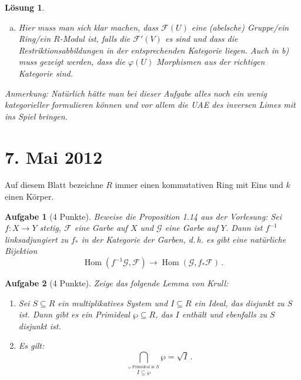 \documentclass[a4paper, 12pt, numbers=noendperiod, chapterprefix=true]{scrbook}
\theoremstyle{break}
\newtheorem{Aufg}{Aufgabe}
\newtheorem{Loes}{L\"osung}
\theoremstyle{nonumberbreak}
\theoremstyle{nonumberplain}
\DeclareMathOperator{\Hom}{Hom}
\newcommand{\F}{\mathcal{F}} %
\newcommand{\G}{\mathcal{G}} %
\begin{document}
\begin{Loes}
\begin{enumerate}[a)]
Sei $f \in \F(U)$. F\"ur alle $V \subseteq U, V \in \mathcal{B}$ sind die Schnitte $\rho^U_V(\varphi(U)(f)) = \varphi(V)(\rho^U_V(f)) \in \G(V)$ festgelegt und bilden eine konsistente Familie in $\G$. Da $\G$ eine Garbe ist, ist $\varphi(U)(f) \in \G(U)$ damit eindeutig bestimmt.

Ist $U' \subseteq U \subseteq X$ offen, dann ist jedes $V \subseteq U', V \in \mathcal{B}$ auch in $U$ enthalten. Es gilt $\rho^{U'}_V(\rho^U_{U'}(\varphi(U)(f))) = \rho^U_V(\varphi(U)(f)) = \varphi(V)(\rho^U_V(f))$, also ist $\rho^U_{U'}(\varphi(U)(f))$ ein Amalgam f\"ur die $\varphi(V)(\rho^U_V(f))$ und es gilt $\rho^U_{U'}(\varphi(U)(f)) = \varphi(U')(\rho^U_ {U'}(f))$. 

\item Hier muss man sich klar machen, dass $\F(U)$ eine (abelsche) Gruppe/ein Ring/ein $R$-Modul ist, falls die $\F'(V)$ es sind und dass die Restriktionsabbildungen in der entsprechenden Kategorie liegen. Auch in b) muss gezeigt werden, dass die $\varphi(U)$ Morphismen aus der richtigen Kategorie sind.
\end{enumerate}

\textit{Anmerkung:} Nat\"urlich h\"atte man bei dieser Aufgabe alles noch ein wenig kategorieller formulieren k\"onnen und vor allem die UAE des inversen Limes mit ins Spiel bringen.
\end{Loes}

\newpage
\section{7. Mai 2012}
\setcounter{Aufg}{0}
\setcounter{Loes}{0}

Auf diesem Blatt bezeichne $R$ immer einen kommutativen Ring mit Eins und $k$ einen %
K\"orper.

\begin{Aufg}[4 Punkte]
 Beweise die Proposition 1.14 aus der Vorlesung:
Sei $f\colon X\to Y$ stetig, $\mathcal{F}$ eine Garbe auf $X$ und $\G$ eine Garbe auf $Y$.
Dann ist $f^{-1}$ linksadjungiert zu $f_\ast$ in der Kategorie der Garben, d.\,h. es gibt eine nat\"urliche Bijektion 
$$\Hom(f^{-1}\G, \F) \to \Hom(\G, f_\ast \F) \,.$$
\end{Aufg}

 
\begin{Aufg}[4 Punkte]
Zeige das folgende Lemma von Krull:
\begin{enumerate}%
 \item Sei $S \subseteq R$ ein multiplikatives System und $I \subseteq R$ ein Ideal, das disjunkt zu $S$ ist.
Dann gibt es ein Primideal $\wp \subseteq R$, das $I$ enth\"alt und ebenfalls zu $S$ disjunkt ist.
 \item Es gilt: $$\bigcap_{\stackrel{\wp \textrm{ Primideal in } R}{I \subseteq \wp}} \wp = \sqrt{I}\,.$$
\end{enumerate}
\end{Aufg}
\end{document}
